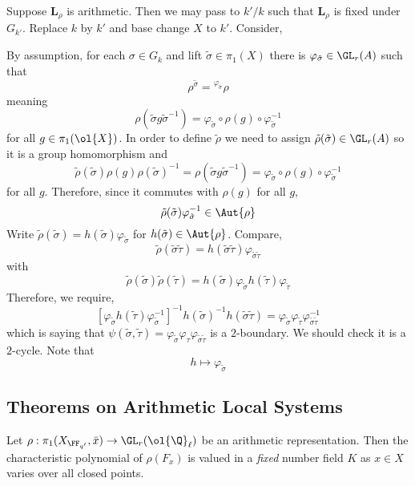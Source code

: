 \documentclass{article}
\newcommand{\Qbar}{\ol{\Q}}
\newcommand{\LL}{\mathbf{L}}
\begin{document}
Suppose $\LL_{\rho}$ is arithmetic. Then we may pass to $k'/k$ such that $\LL_{\rho}$ is fixed under $G_{k'}$. Replace $k$ by $k'$ and base change $X$ to $k'$. Consider,
\begin{center}
\end{center}
By assumption, for each $\sigma \in G_k$ and lift $\tilde{\sigma} \in \pi_1(X)$ there is $\varphi_{\tilde{\sigma}} \in \GL_r(A)$ such that 
\[ \rho^{\tilde{\sigma}} = {}^{\varphi_{\tilde{\sigma}}} \rho \]
meaning
\[ \rho(\tilde{\sigma} g \tilde{\sigma}^{-1}) = \varphi_{\tilde{\sigma}} \circ \rho(g) \circ \varphi_{\tilde{\sigma}}^{-1} \]
for all $g \in \pi_1(\ol{X})$. In order to define $\tilde{\rho}$ we need to assign $\tilde{\rho}(\tilde{\sigma}) \in \GL_r(A)$ so it is a group homomorphism and
\[ \tilde{\rho}(\tilde{\sigma}) \rho(g) \rho(\tilde{\sigma})^{-1} = \rho(\tilde{\sigma} g \tilde{\sigma}^{-1}) = \varphi_{\tilde{\sigma}} \circ \rho(g) \circ \varphi_{\tilde{\sigma}}^{-1} \]
for all $g$. Therefore, since it commutes with $\rho(g)$ for all $g$,
\[ \tilde{\rho}(\tilde{\sigma}) \varphi_{\tilde{\sigma}}^{-1} \in \Aut{\rho} \]
Write $\tilde{\rho}(\tilde{\sigma}) = h(\tilde{\sigma}) \varphi_{\tilde{\sigma}}$ for $h(\tilde{\sigma}) \in \Aut{\rho}$. Compare,
\[ \tilde{\rho}(\tilde{\sigma} \tilde{\tau}) = h(\tilde{\sigma} \tilde{\tau}) \varphi_{\tilde{\sigma} \tilde{\tau}} \]
with
\[ \tilde{\rho}(\tilde{\sigma}) \tilde{\rho}(\tilde{\tau}) = h(\tilde{\sigma}) \varphi_{\tilde{\sigma}} h(\tilde{\tau}) \varphi_{\tilde{\tau}} \]
Therefore, we require,
\[ [\varphi_{\tilde{\sigma}} h(\tilde{\tau}) \varphi_{\tilde{\sigma}}^{-1}]^{-1} h(\tilde{\sigma})^{-1} h(\tilde{\sigma} \tilde{\tau}) = \varphi_{\tilde{\sigma}} \varphi_{\tilde{\tau}} \varphi_{\tilde{\sigma} \tilde{\tau}}^{-1} \]
which is saying that $\psi(\tilde{\sigma}, \tilde{\tau}) = \varphi_{\tilde{\sigma}} \varphi_{\tau} \varphi_{\tilde{\sigma} \tilde{\tau}}$ is a $2$-boundary. We should check it is a $2$-cycle. Note that 
\[ h \mapsto \varphi_{\tilde{\sigma}} \]

\subsection{Theorems on Arithmetic Local Systems}

\begin{theorem}[Lafforgue]
Let $\rho : \pi_1(X_{\FF_{q'}}, \bar{x}) \to \GL_r(\Qbar_\ell)$ be an arithmetic representation. Then the characteristic polynomial of $\rho(F_x)$ is valued in a \textit{fixed} number field $K$ as $x \in X$ varies over all closed points. 
\end{theorem}
\end{document}
